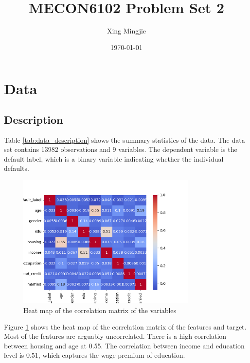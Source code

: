 \documentclass[10pt]{article} %
\title{MECON6102 Problem Set 2}
\author{Xing Mingjie}
\date{\today} %
\begin{document}
\maketitle



\section{Data}
    \subsection{Description}
    

    Table \ref{tab:data_description} shows the summary statistics of the data. The data set contains 13982 observations and 9 variables. The dependent variable is the default label, which is a binary variable indicating whether the individual defaults. 

    \begin{figure}
        \centering
        \includegraphics[width=0.8\textwidth]{"../fig/variable_heatmap.png"}
        \caption{Heat map of the correlation matrix of the variables}
        \label{fig:variable_heatmap}
    \end{figure}
    Figure \ref{fig:variable_heatmap} shows the heat map of the correlation matrix of the features and target. Most of the features are arguably uncorrelated. There is a high correlation between housing and age at 0.55. The correlation between income and education level is 0.51, which captures the wage premium of education.
\end{document}
